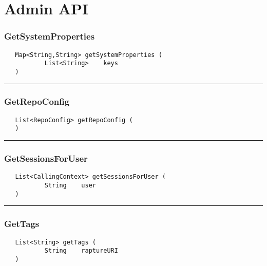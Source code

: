 \chapter{Admin API}

\subsection{GetSystemProperties}
\label{Api:GetSystemProperties}
\begin{verbatim}
   Map<String,String> getSystemProperties (
           List<String>    keys
   )
\end{verbatim}



\rule{15cm}{2pt}
\subsection{GetRepoConfig}
\label{Api:GetRepoConfig}
\begin{verbatim}
   List<RepoConfig> getRepoConfig (
   )
\end{verbatim}



\rule{15cm}{2pt}
\subsection{GetSessionsForUser}
\label{Api:GetSessionsForUser}
\begin{verbatim}
   List<CallingContext> getSessionsForUser (
           String    user
   )
\end{verbatim}



\rule{15cm}{2pt}
\subsection{GetTags}
\label{Api:GetTags}
\begin{verbatim}
   List<String> getTags (
           String    raptureURI
   )
\end{verbatim}




